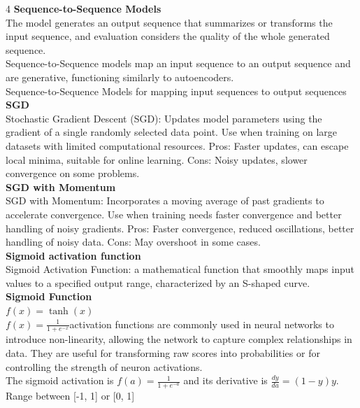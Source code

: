 \documentclass[8pt]{extarticle}
\begin{document}
\begin{multicols}{4}
{\vspace{2pt}\textbf{Sequence-to-Sequence Models}\\
The model generates an output sequence that summarizes or transforms the input sequence, and evaluation considers the quality of the whole generated sequence.\\
Sequence-to-Sequence models map an input sequence to an output sequence and are generative, functioning similarly to autoencoders.\\
Sequence-to-Sequence Models for mapping input sequences to output sequences\\
\vspace{2pt}\textbf{SGD}\\
Stochastic Gradient Descent (SGD): Updates model parameters using the gradient of a single randomly selected data point. Use when training on large datasets with limited computational resources. Pros: Faster updates, can escape local minima, suitable for online learning. Cons: Noisy updates, slower convergence on some problems.\\
\vspace{2pt}\textbf{SGD with Momentum}\\
SGD with Momentum: Incorporates a moving average of past gradients to accelerate convergence. Use when training needs faster convergence and better handling of noisy gradients. Pros: Faster convergence, reduced oscillations, better handling of noisy data. Cons: May overshoot in some cases.\\
\vspace{2pt}\textbf{Sigmoid activation function}\\
Sigmoid Activation Function: a mathematical function that smoothly maps input values to a specified output range, characterized by an S-shaped curve.\\
\vspace{2pt}\textbf{Sigmoid Function}\\
$f(x) = \tanh(x)$\\
$f(x) = \frac{1}{1 + e^{-x}}$\Sigmoid activation functions are commonly used in neural networks to introduce non-linearity, allowing the network to capture complex relationships in data. They are useful for transforming raw scores into probabilities or for controlling the strength of neuron activations.\\
The sigmoid activation is $f(a) = \frac{1}{1+e^{-a}}$ and its derivative is $\frac{dy}{da} = (1 - y) y$.\\
Range between [-1, 1] or [0, 1]\\
}
\end{multicols}
\end{document}
